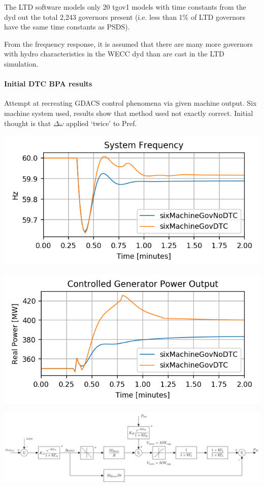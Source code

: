 \documentclass[12pt]{article}
\begin{document}
The LTD software models only 20 tgov1 models with time constants from the dyd out the total 2,243 governors present (i.e. less than 1\% of LTD governors have the same time constants as PSDS).

From the frequency response, it is assumed that there are many more governors with hydro characteristics in the WECC dyd than are cast in the LTD simulation.

\pagebreak
\paragraph{Initial DTC BPA results} Attempt at recreating GDACS control phenomena via given machine output.
Six machine system used, results show that method used not exactly correct.
Initial thought is that $\Delta \omega$ applied `twice' to Pref.

\begin{minipage}{.49\linewidth}
\includegraphics[width=\linewidth]{figures/f}
\end{minipage}%
\begin{minipage}{.49\linewidth}
\includegraphics[width=\linewidth]{figures/pe}
\end{minipage}
\centering
\includegraphics[width=.8\linewidth]{../../models/tgov1/tgov1DBdelay}
\end{document}
